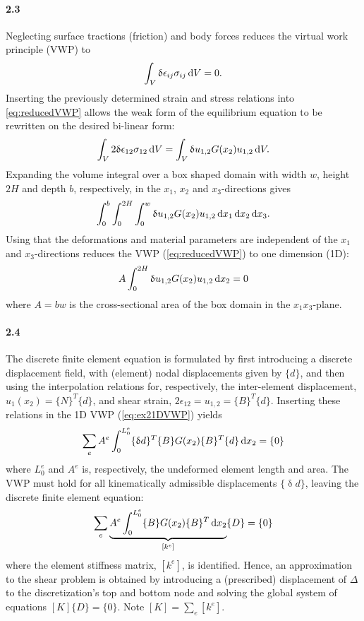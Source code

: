 \begin{multicols}{2}
\paragraph{2.3} Neglecting surface tractions (friction) and body forces reduces the virtual work principle (VWP) to 
\begin{equation}
    \int_V \updelta \epsilon_{ij} \sigma_{ij} \dif V = 0.
    \label{eq:reducedVWP}
\end{equation}
Inserting the previously determined strain and stress relations into \cref{eq:reducedVWP} allows the weak form of the equilibrium equation to be rewritten on the desired bi-linear form:
\begin{equation}
    \nonumber
    \int_V 2\updelta \epsilon_{12} \sigma_{12} \dif V = \int_V \updelta u_{1,2}G(x_2)u_{1,2} \dif V .
\end{equation}
Expanding the volume integral over a box shaped domain with width $w$, height $2H$ and depth $b$, respectively, in the $x_1$, $x_2$ and $x_3$-directions gives
\begin{equation}
\int_{0}^b\int_0^{2H}\int_0^w \updelta u_{1,2}G(x_2)u_{1,2} \dif x_1 \dif x_2 \dif x_3.
\label{eq:ex2ExpandedVolint}
\end{equation}
Using that the deformations and material parameters are independent of the $x_1$ and $x_3$-directions reduces the VWP (\cref{eq:reducedVWP}) to one dimension (1D):
\begin{equation}
A\int_0^{2H} \updelta u_{1,2}G(x_2)u_{1,2} \dif x_2 = 0
\label{eq:ex21DVWP}
\end{equation}
where $A=bw$ is the cross-sectional area of the box domain in the $x_1x_3$-plane.
\squeezeup
\squeezeup
\paragraph{2.4} The discrete finite element equation is formulated by first introducing a discrete displacement field, with (element) nodal displacements given by $\{d\}$, and then using the interpolation relations for, respectively, the inter-element displacement, $u_1(x_2)=\{N\}^T\{d\}$, and shear strain, $2\epsilon_{12}=u_{1,2}=\{B\}^T\{d\}$. Inserting these relations in the 1D VWP (\cref{eq:ex21DVWP}) yields
\begin{equation}
 \sum_e A^e \int_0^{L_0^e} \{\updelta d\}^T\{B\} G(x_2) \{B\}^T\{d\} \dif x_2 = \{0\} 
\nonumber
\end{equation}
where $L_0^e$ and $A^e$ is, respectively, the undeformed element length and area. The VWP must hold for all kinematically admissible displacements $\{\updelta d\}$, leaving the discrete finite element equation:
\begin{equation}
\sum_e  \underbrace{A^e\int_0^{L_0^e} \{B\} G(x_2) \{B\}^T \dif x_2}_{[k^e]} \{D\} = \{0\}  
\nonumber
\end{equation}
where the element stiffness matrix, $[k^e]$, is identified. Hence, an approximation to the shear problem is obtained by introducing a (prescribed) displacement of $\Delta$ to the discretization's top and bottom node and solving the global system of equations $[K]\{D\}=\{0\}$. Note $[K]=\sum_e[k^e]$.
\squeezeup
\vspace{-2mm}

\end{multicols}
